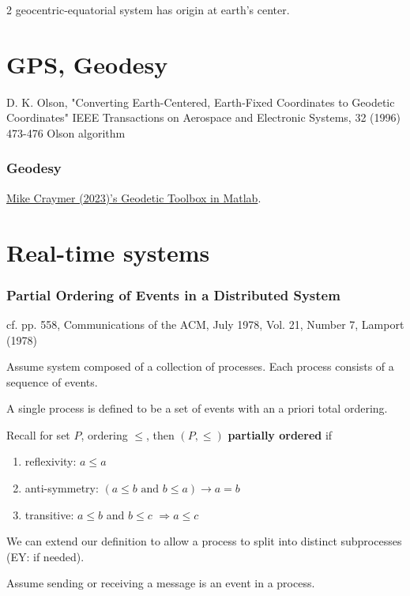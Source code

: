 \documentclass[10pt]{amsart}
\begin{document}
\begin{multicols*}{2}
geocentric-equatorial system has origin at earth's center.


\part{GPS, Geodesy} 

D. K. Olson, "Converting Earth-Centered, Earth-Fixed Coordinates to Geodetic Coordinates" IEEE Transactions on Aerospace and Electronic Systems, 32 (1996) 473-476 Olson algorithm

\section{Geodesy}

\href{https://www.mathworks.com/matlabcentral/fileexchange/15285-geodetic-toolbox}{Mike Craymer (2023)'s Geodetic Toolbox in Matlab}. 

\part{Real-time systems}

\section{Partial Ordering of Events in a Distributed System}

cf. pp. 558, Communications of the ACM, July 1978, Vol. 21, Number 7, Lamport (1978) \cite{Lamp1978}

Assume system composed of a collection of processes. Each process consists of a sequence of events.

A single process is defined to be a set of events with an a priori total ordering.

Recall for set $P$, ordering $\leq$, then $(P, \leq)$ \textbf{partially ordered} if 
\begin{enumerate}
	\item reflexivity: $a \leq a$
	\item anti-symmetry: $(a\leq b \text{ and } b\leq a) \to a = b$
	\item transitive: $a\leq b$ and $b\leq c$ $\Longrightarrow a \leq c$
\end{enumerate}

We can extend our definition to allow a process to split into distinct subprocesses (EY: if needed).

Assume sending or receiving a message is an event in a process.


\end{multicols*}
\end{document}
